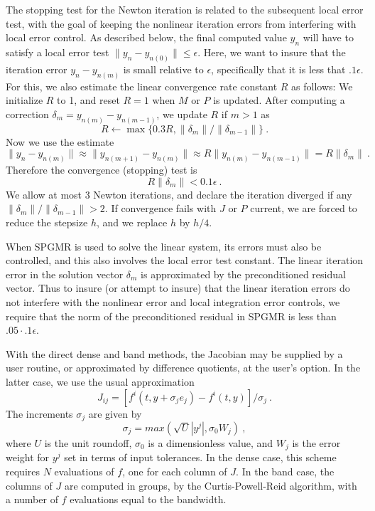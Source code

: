 The stopping test for the Newton iteration is related to the
subsequent local error test, with the goal of keeping the nonlinear
iteration errors from interfering with local error control.  As
described below, the final computed value $y_n$ will have to satisfy a
local error test $\| y_n - y_{n(0)} \| \leq \epsilon$.  Here, we want
to insure that the iteration error $y_n - y_{n(m)}$ is small relative
to $\epsilon$, specifically that it is less that $.1 \epsilon$.
For this, we also estimate the linear convergence rate constant $R$ as
follows: We initialize $R$ to 1, and reset $R = 1$ when $M$ or $P$ is
updated.  After computing a correction $\delta_m = y_{n(m)}-y_{n(m-1)}$,
we update $R$ if $m > 1$ as
\[ R \leftarrow \max\{0.3R , \|\delta_m\| / \|\delta_{m-1}\| \} ~. \]
Now we use the estimate
\[ \| y_n - y_{n(m)} \| \approx \| y_{n(m+1)} - y_{n(m)} \| 
   \approx R \| y_{n(m)} - y_{n(m-1)} \|  =  R \|\delta_m \| ~. \]
Therefore the convergence (stopping) test is 
\[  R \|\delta_m \| < 0.1 \epsilon ~. \]
We allow at most 3 Newton iterations, and declare the iteration
diverged if any $\|\delta_m\| / \|\delta_{m-1}\| > 2$.  If convergence
fails with $J$ or $P$ current, we are forced to reduce the stepsize
$h$, and we replace $h$ by $h/4$.

When SPGMR is used to solve the linear system, its errors must also be
controlled, and this also involves the local error test constant.  The
linear iteration error in the solution vector $\delta_m$ is
approximated by the preconditioned residual vector.  Thus to insure
(or attempt to insure) that the linear iteration errors do not
interfere with the nonlinear error and local integration error
controls, we require that the norm of the preconditioned residual
in SPGMR is less than $.05 \cdot .1 \epsilon$.

With the direct dense and band methods, the Jacobian may be supplied
by a user routine, or approximated by difference quotients,
at the user's option.  In the latter case, we use the usual
approximation
\[ J_{ij} = [f^i(t,y+\sigma_j e_j) - f^i(t,y)]/\sigma_j ~. \]
The increments $\sigma_j$ are given by
\[ \sigma_j = max(\sqrt{U} |y^j| , \sigma_0 W_j) ~, \]
where $U$ is the unit roundoff, $\sigma_0$ is a dimensionless value,
and $W_j$ is the error weight for $y^j$ set in terms of input
tolerances.  In the dense case, this scheme requires $N$ evaluations
of $f$, one for each column of $J$.  In the band case, the columns
of $J$ are computed in groups, by the Curtis-Powell-Reid algorithm,
with a number of $f$ evaluations equal to the bandwidth.

